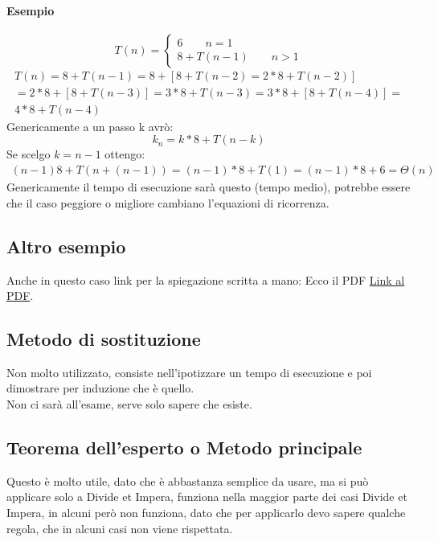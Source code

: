 \paragraph*{Esempio}
\begin{equation*}
    T(n)=
    \begin{cases}
        6 \qquad n=1 \\
        8 + T(n-1) \qquad n>1
    \end{cases}
\end{equation*}
\begin{align*}
    T(n)=8+T(n-1)=8+[8+T(n-2)=2*8+T(n-2)]\\
    =2*8+[8+T(n-3)]=3*8+T(n-3)=3*8+[8+T(n-4)]=\\
    4*8+T(n-4)
\end{align*}
Genericamente a un passo k avrò:
\begin{equation*}
    k_n = k*8+T(n-k)
\end{equation*}
Se scelgo $k=n-1$ ottengo:
\begin{align*}
    (n-1)8+T(n+(n-1))=(n-1)*8+T(1)=(n-1)*8+6=\Theta(n)
\end{align*}
Genericamente il tempo di esecuzione sarà questo (tempo medio), potrebbe
essere che il caso peggiore o migliore cambiano l'equazioni di ricorrenza.
\subsection*{Altro esempio}
Anche in questo caso link per la spiegazione scritta a mano: 
Ecco il PDF \href{https://drive.google.com/file/d/1X2pnz8e_e90ANsCgoa3XvzzbBoAKjfts/view?usp=sharing}{Link al PDF}.
\subsection{Metodo di sostituzione}
Non molto utilizzato, consiste nell'ipotizzare un tempo di esecuzione e poi
dimostrare per induzione che è quello.\\
Non ci sarà all'esame, serve solo sapere che esiste.
\subsection{Teorema dell'esperto o Metodo principale}
Questo è molto utile, dato che è abbastanza semplice da usare, ma si può applicare
solo a Divide et Impera, funziona nella maggior parte dei casi Divide et Impera, in alcuni
però non funziona, dato che per applicarlo devo sapere qualche regola, che in alcuni casi non viene
rispettata.

